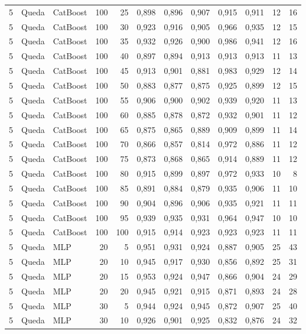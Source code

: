 \begin{longtable}{@{}rllrrrrrrrrr@{}}
5 & Queda & CatBoost & 100 & 25 & 0,898 & 0,896 & 0,907 & 0,915 & 0,911 & 12 & 16 \\
5 & Queda & CatBoost & 100 & 30 & 0,923 & 0,916 & 0,905 & 0,966 & 0,935 & 12 & 15 \\
5 & Queda & CatBoost & 100 & 35 & 0,932 & 0,926 & 0,900 & 0,986 & 0,941 & 12 & 16 \\
5 & Queda & CatBoost & 100 & 40 & 0,897 & 0,894 & 0,913 & 0,913 & 0,913 & 11 & 13 \\
5 & Queda & CatBoost & 100 & 45 & 0,913 & 0,901 & 0,881 & 0,983 & 0,929 & 12 & 14 \\
5 & Queda & CatBoost & 100 & 50 & 0,883 & 0,877 & 0,875 & 0,925 & 0,899 & 12 & 15 \\
5 & Queda & CatBoost & 100 & 55 & 0,906 & 0,900 & 0,902 & 0,939 & 0,920 & 11 & 13 \\
5 & Queda & CatBoost & 100 & 60 & 0,885 & 0,878 & 0,872 & 0,932 & 0,901 & 11 & 12 \\
5 & Queda & CatBoost & 100 & 65 & 0,875 & 0,865 & 0,889 & 0,909 & 0,899 & 11 & 14 \\
5 & Queda & CatBoost & 100 & 70 & 0,866 & 0,857 & 0,814 & 0,972 & 0,886 & 11 & 12 \\
5 & Queda & CatBoost & 100 & 75 & 0,873 & 0,868 & 0,865 & 0,914 & 0,889 & 11 & 12 \\
5 & Queda & CatBoost & 100 & 80 & 0,915 & 0,899 & 0,897 & 0,972 & 0,933 & 10 & 8 \\
5 & Queda & CatBoost & 100 & 85 & 0,891 & 0,884 & 0,879 & 0,935 & 0,906 & 11 & 10 \\
5 & Queda & CatBoost & 100 & 90 & 0,904 & 0,896 & 0,906 & 0,935 & 0,921 & 11 & 11 \\
5 & Queda & CatBoost & 100 & 95 & 0,939 & 0,935 & 0,931 & 0,964 & 0,947 & 10 & 10 \\
5 & Queda & CatBoost & 100 & 100 & 0,915 & 0,914 & 0,923 & 0,923 & 0,923 & 11 & 11 \\
5 & Queda & MLP & 20 & 5 & 0,951 & 0,931 & 0,924 & 0,887 & 0,905 & 25 & 43 \\
5 & Queda & MLP & 20 & 10 & 0,945 & 0,917 & 0,930 & 0,856 & 0,892 & 25 & 31 \\
5 & Queda & MLP & 20 & 15 & 0,953 & 0,924 & 0,947 & 0,866 & 0,904 & 24 & 29 \\
5 & Queda & MLP & 20 & 20 & 0,945 & 0,921 & 0,915 & 0,871 & 0,893 & 24 & 28 \\
5 & Queda & MLP & 30 & 5 & 0,944 & 0,924 & 0,945 & 0,872 & 0,907 & 25 & 40 \\
5 & Queda & MLP & 30 & 10 & 0,926 & 0,901 & 0,925 & 0,832 & 0,876 & 24 & 32 \\

\end{longtable}
